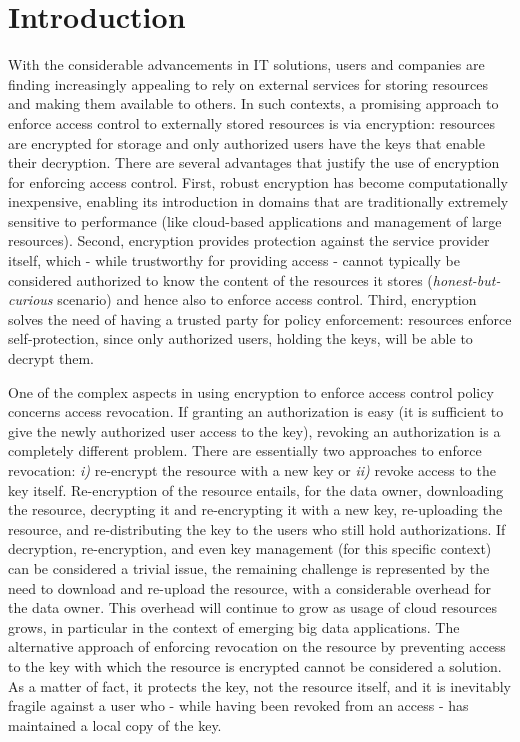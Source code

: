 \section{Introduction}\label{ms:sec:intro}

With the considerable advancements in IT solutions, users and companies are finding increasingly appealing to rely on external services for storing resources and making them available to others. In such contexts, a promising approach to enforce access control to externally stored resources is via encryption: resources are encrypted for storage and only authorized users have the keys that enable their decryption. There are several advantages that justify the use of encryption for enforcing access control. First, robust encryption has become computationally inexpensive, enabling its introduction in domains that are traditionally extremely sensitive to performance (like cloud-based applications and management of large resources). Second, encryption provides protection against the service provider itself, which - while trustworthy for providing access - cannot typically be considered authorized to know the content of the resources it stores ({\em honest-but-curious\/} scenario) and hence also to enforce access control. Third, encryption solves the need of having a trusted party for policy enforcement: resources enforce self-protection, since only authorized users, holding the keys, will be able to decrypt them.
 
One of the complex aspects in using encryption to enforce access control policy concerns access revocation. If granting an authorization is easy (it is sufficient to give the newly authorized user access to the key), revoking an authorization is a completely different problem. There are essentially two approaches to enforce revocation: {\em i)\/} re-encrypt the resource with a new key or {\em ii)\/} revoke access to the key itself. Re-encryption of the resource entails, for the data owner, downloading the resource, decrypting it and re-encrypting it with a new key, re-uploading the resource, and re-distributing the key to the users who still hold authorizations. If decryption, re-encryption, and even key management (for this specific context) can be considered a trivial issue, the remaining challenge is represented by the need to download and re-upload the resource, with a considerable overhead for the data owner. This overhead will continue to grow as usage of cloud resources grows, in particular in the context of emerging big data applications. The alternative approach of enforcing revocation on the resource by preventing access to the key with which the resource is encrypted cannot be considered a solution. As a matter of fact, it protects the key, not the resource itself, and it is inevitably fragile against a user who - while having been revoked from an access - has maintained a local copy of the key.

